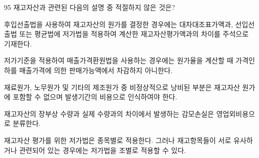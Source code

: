 \begin{question}{95}
재고자산과 관련된 다음의 설명 중 적절하지 않은 것은?
\begin{choices}
  \item 후입선출법을 사용하여 재고자산의 원가를 결정한 경우에는 대차대조표가액과, 선입선출법 또는 평균법에 저가법을 적용하여 계산한 재고자산평가액과의 차이를 주석으로 기재한다.
  \item 저가기준을 적용하여 매출가격환원법을 사용하는 경우에는 원가율을 계산할 때 가격인하를 매출가격에 의한 판매가능액에서 차감하지 아니한다.
  \item 재료원가, 노무원가 및 기타의 제조원가 중 비정상적으로 낭비된 부분은 재고자산 원가에 포함할 수 없으며 발생기간의 비용으로 인식하여야 한다.
  \item 재고자산의 장부상 수량과 실제 수량과의 차이에서 발생하는 감모손실은 영업외비용으로 분류한다.
  \item 재고자산 평가를 위한 저가법은 종목별로 적용한다. 그러나 재고항목들이 서로 유사하거나 관련되어 있는 경우에는 저가법을 조별로 적용할 수 있다.
\end{choices}
\end{question}
